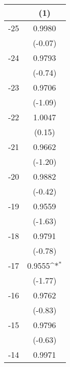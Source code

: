 {
\def\sym#1{\ifmmode^{#1}\else\(^{#1}\)\fi}
\begin{tabular}{l*{1}{c}}
\hline\hline
                                   &\multicolumn{1}{c}{(1)}         \\
\hline
  -25                              &      0.9980         \\
                                   &     (-0.07)         \\
[1em]
  -24                              &      0.9793         \\
                                   &     (-0.74)         \\
[1em]
  -23                              &      0.9706         \\
                                   &     (-1.09)         \\
[1em]
  -22                              &      1.0047         \\
                                   &      (0.15)         \\
[1em]
  -21                              &      0.9662         \\
                                   &     (-1.20)         \\
[1em]
  -20                              &      0.9882         \\
                                   &     (-0.42)         \\
[1em]
  -19                              &      0.9559         \\
                                   &     (-1.63)         \\
[1em]
  -18                              &      0.9791         \\
                                   &     (-0.78)         \\
[1em]
  -17                              &      0.9555\sym{*}  \\
                                   &     (-1.77)         \\
[1em]
  -16                              &      0.9762         \\
                                   &     (-0.83)         \\
[1em]
  -15                              &      0.9796         \\
                                   &     (-0.63)         \\
[1em]
  -14                              &      0.9971         \\

\end{tabular}}
